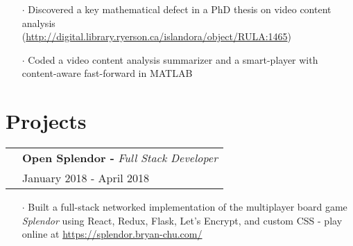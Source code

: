 \documentclass[a4paper, oneside, final]{scrartcl} %
\newcommand{\gray}{\rowcolor[gray]{.90}} %
\begin{document}
\begin{center}
\begin{itemize}
    \item[$\cdot$] Discovered a key mathematical defect in a PhD thesis on video content analysis \\(\url{http://digital.library.ryerson.ca/islandora/object/RULA:1465})\\
    \item[$\cdot$] Coded a video content analysis summarizer and a smart-player with content-aware fast-forward in MATLAB\\

  \end{itemize}

  \vspace{-0.2cm}



  \section{Projects}
  \renewcommand{\arraystretch}{1.3}

  \begin{tabularx}{1.00\linewidth}{>{\raggedleft\scshape}p{0cm}X}
    \gray& \textbf{Open Splendor -} \textit{Full Stack Developer}\\
    \gray & {January 2018 - April 2018}\\
  \end{tabularx}
  \begin{itemize}\itemsep-0.2cm
      \vspace{-0.1cm}
    \item[$\cdot$] Built a full-stack networked implementation of the multiplayer board game \textit{Splendor} using React, Redux, Flask, Let's Encrypt, and custom CSS - play online at \href{https://splendor.bryan-chu.com/}{https://splendor.bryan-chu.com/}\\
  \end{itemize}
  \vspace{-0.2cm}


\end{center}
\end{document}
